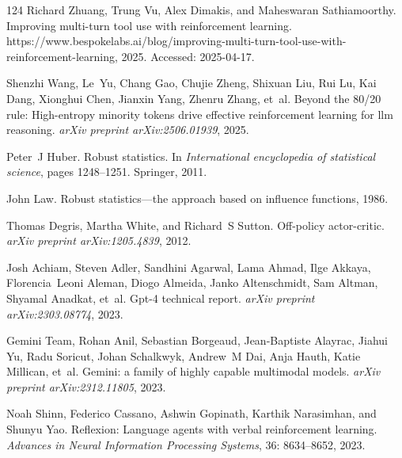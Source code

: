 \documentclass[]{youtu} %
\begin{document}
\begin{thebibliography}{124}
Richard Zhuang, Trung Vu, Alex Dimakis, and Maheswaran Sathiamoorthy.
\newblock Improving multi-turn tool use with reinforcement learning.
\newblock https://www.bespokelabs.ai/blog/improving-multi-turn-tool-use-with-reinforcement-learning, 2025.
\newblock Accessed: 2025-04-17.

Shenzhi Wang, Le~Yu, Chang Gao, Chujie Zheng, Shixuan Liu, Rui Lu, Kai Dang, Xionghui Chen, Jianxin Yang, Zhenru Zhang, et~al.
\newblock Beyond the 80/20 rule: High-entropy minority tokens drive effective reinforcement learning for llm reasoning.
\newblock \emph{arXiv preprint arXiv:2506.01939}, 2025{}.

Peter~J Huber.
\newblock Robust statistics.
\newblock In \emph{International encyclopedia of statistical science}, pages 1248--1251. Springer, 2011.

John Law.
\newblock Robust statistics—the approach based on influence functions, 1986.

Thomas Degris, Martha White, and Richard~S Sutton.
\newblock Off-policy actor-critic.
\newblock \emph{arXiv preprint arXiv:1205.4839}, 2012.

Josh Achiam, Steven Adler, Sandhini Agarwal, Lama Ahmad, Ilge Akkaya, Florencia~Leoni Aleman, Diogo Almeida, Janko Altenschmidt, Sam Altman, Shyamal Anadkat, et~al.
\newblock Gpt-4 technical report.
\newblock \emph{arXiv preprint arXiv:2303.08774}, 2023.

Gemini Team, Rohan Anil, Sebastian Borgeaud, Jean-Baptiste Alayrac, Jiahui Yu, Radu Soricut, Johan Schalkwyk, Andrew~M Dai, Anja Hauth, Katie Millican, et~al.
\newblock Gemini: a family of highly capable multimodal models.
\newblock \emph{arXiv preprint arXiv:2312.11805}, 2023.

Noah Shinn, Federico Cassano, Ashwin Gopinath, Karthik Narasimhan, and Shunyu Yao.
\newblock Reflexion: Language agents with verbal reinforcement learning.
\newblock \emph{Advances in Neural Information Processing Systems}, 36: 8634--8652, 2023.


\end{thebibliography}
\end{document}
